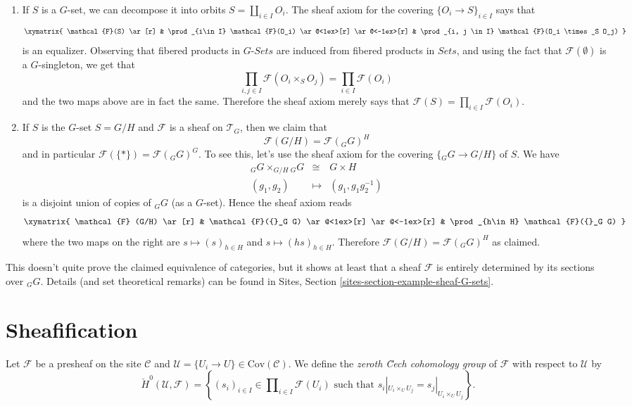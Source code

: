 \begin{enumerate}
\item
If $S$ is a $G$-set, we can decompose it into orbits $S = \coprod_{i\in I}
O_i$. The sheaf axiom for the covering $\{O_i \to S\}_{i\in I}$ says that
$$
\xymatrix{
\mathcal{F}(S) \ar[r] &
\prod_{i\in I} \mathcal{F}(O_i) \ar@<1ex>[r] \ar@<-1ex>[r] &
\prod_{i, j \in I} \mathcal{F}(O_i \times_S O_j)
}
$$
is an equalizer. Observing that fibered products in $G\textit{-Sets}$ are
induced from fibered products in $\textit{Sets}$, and using the fact that
$\mathcal{F}(\emptyset)$ is a $G$-singleton, we get that
$$
\prod_{i, j \in I} \mathcal{F}(O_i \times_S O_j) = \prod_{i \in I}
\mathcal{F}(O_i)
$$
and the two maps above are in fact the same. Therefore the sheaf axiom merely
says that $\mathcal{F}(S) = \prod_{i\in I} \mathcal{F}(O_i)$.
\item
If $S$ is the $G$-set $S= G/H$ and $\mathcal{F}$ is a sheaf on $\mathcal{T}_G$,
then we claim that
$$
\mathcal{F}(G/H) = \mathcal{F}({}_G G)^H
$$
and in particular $\mathcal{F}(\{*\}) = \mathcal{F}({}_G G)^G$. To see this,
let's use the sheaf axiom for the covering $\{ {}_G G \to G/H \}$ of $S$. We
have
\begin{eqnarray*}
{}_G G \times_{G/H} {}_G G & \cong & G \times H \\
(g_1, g_2) & \longmapsto & (g_1, g_1 g_2^{-1})
\end{eqnarray*}
is a disjoint union of copies of ${}_G G$ (as a $G$-set). Hence the sheaf axiom
reads
$$
\xymatrix{
\mathcal{F} (G/H) \ar[r] &
\mathcal{F}({}_G G) \ar@<1ex>[r] \ar@<-1ex>[r] &
\prod_{h\in H} \mathcal{F}({}_G G)
}
$$
where the two maps on the right are $s \mapsto (s)_{h \in H}$ and $s \mapsto
(hs)_{h \in H}$. Therefore $\mathcal{F}(G/H) = \mathcal{F}({}_G G)^H$ as
claimed.
\end{enumerate}
This doesn't quite prove the claimed equivalence of categories, but it shows at
least that a sheaf $\mathcal{F}$ is entirely determined by its sections over
${}_G G$. Details (and set theoretical remarks) can be found in
Sites, Section \ref{sites-section-example-sheaf-G-sets}.




\section{Sheafification}
\label{section-sheafification}

\begin{definition}
\label{definition-0-cech}
Let $\mathcal{F}$ be a presheaf on the site $\mathcal{C}$ and
$\mathcal{U} = \{U_i \to U\} \in \text{Cov} (\mathcal{C})$.
We define the {\it zeroth \u Cech cohomology group} of
$\mathcal{F}$ with respect to $\mathcal{U}$ by
$$
\check H^0 (\mathcal{U}, \mathcal{F}) =
\left\{
(s_i)_{i\in I} \in \prod\nolimits_{i\in I }\mathcal{F}(U_i)
\text{ such that }
s_i|_{U_i \times_U U_j} = s_j |_{U_i \times_U U_j}
\right\}.
$$
\end{definition}

